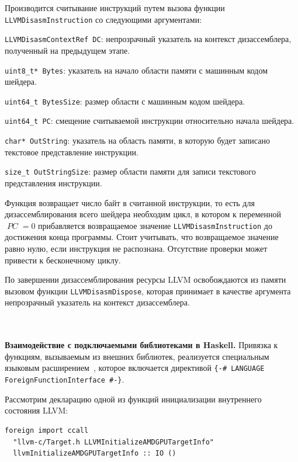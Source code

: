 \documentclass[a4paper,14pt]{extarticle}
\newcommand{\topic}[1]{\textbf{#1.}}
\newcommand{\var}[1]{\mathop{\mathit{#1}}}
\begin{document}
{\begin{ol}
\item Производится считывание инструкций путем вызова функции
\verb|LLVMDisasmInstruction| со следующими аргументами:
  \begin{ol}
  \item \verb|LLVMDisasmContextRef DC|: непрозрачный указатель на контекст дизассемблера,
полученный на предыдущем этапе.
  \item \verb|uint8_t* Bytes|: указатель на начало области памяти с машинным кодом шейдера.
  \item \verb|uint64_t BytesSize|: размер области с машинным кодом шейдера.
  \item \verb|uint64_t PC|: смещение считываемой инструкции относительно начала шейдера.
  \item \verb|char* OutString|: указатель на область памяти, в которую будет записано
текстовое представление инструкции.
  \item \verb|size_t OutStringSize|: размер области памяти для записи текстового представления инструкции.
  \end{ol}
Функция возвращает число байт в считанной инструкции, то есть для дизассемблирования всего шейдера необходим цикл,
в котором к переменной $\var{PC}=0$ прибавляется возвращаемое значение \verb|LLVMDisasmInstruction| до
достижения конца программы.
Стоит учитывать, что возвращаемое значение равно нулю, если инструкция не распознана. Отсутствие проверки
может привести к бесконечному циклу.

\item По завершении дизассемблирования ресурсы LLVM освобождаются из памяти вызовом
функции \verb|LLVMDisasmDispose|, которая принимает в качестве аргумента
непрозрачный указатель на контекст дизассемблера.
\end{ol} \ \\\\ %

\topic{Взаимодействие с подключаемыми библиотеками в Haskell} Привязка к функциям,
вызываемым из внешних библиотек, реализуется специальным языковым
расширением~\cite[глава~17]{rwhaskell}, которое включается директивой
\verb|{-# LANGUAGE ForeignFunctionInterface #-}|.

Рассмотрим декларацию одной из функций инициализации внутреннего состояния LLVM:
\begin{verbatim}
foreign import ccall
  "llvm-c/Target.h LLVMInitializeAMDGPUTargetInfo"
  llvmInitializeAMDGPUTargetInfo :: IO ()
\end{verbatim}

}
\end{document}
